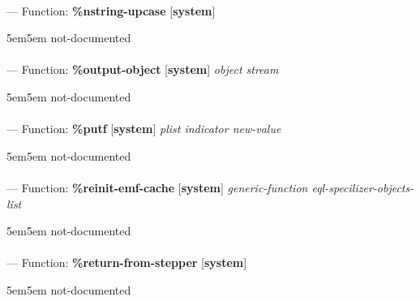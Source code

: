 \paragraph{}
\label{SYSTEM:NSTRING-UPCASE}
--- Function: \textbf{\%nstring-upcase} [\textbf{system}] \textit{}

\begin{adjustwidth}{5em}{5em}
not-documented
\end{adjustwidth}

\paragraph{}
\label{SYSTEM:OUTPUT-OBJECT}
--- Function: \textbf{\%output-object} [\textbf{system}] \textit{object stream}

\begin{adjustwidth}{5em}{5em}
not-documented
\end{adjustwidth}

\paragraph{}
\label{SYSTEM:PUTF}
--- Function: \textbf{\%putf} [\textbf{system}] \textit{plist indicator new-value}

\begin{adjustwidth}{5em}{5em}
not-documented
\end{adjustwidth}

\paragraph{}
\label{SYSTEM:REINIT-EMF-CACHE}
--- Function: \textbf{\%reinit-emf-cache} [\textbf{system}] \textit{generic-function eql-specilizer-objects-list}

\begin{adjustwidth}{5em}{5em}
not-documented
\end{adjustwidth}

\paragraph{}
\label{SYSTEM:RETURN-FROM-STEPPER}
--- Function: \textbf{\%return-from-stepper} [\textbf{system}] \textit{}

\begin{adjustwidth}{5em}{5em}
not-documented
\end{adjustwidth}

